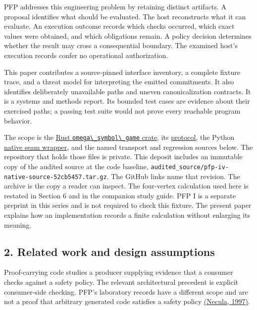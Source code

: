 \documentclass[
  11pt,
]{article}
\newcommand{\passthrough}[1]{#1}
\begin{document}
PFP addresses this engineering problem by retaining distinct artifacts.
A proposal identifies what should be evaluated. The host reconstructs
what it can evaluate. An execution outcome records which checks
occurred, which exact values were obtained, and which obligations
remain. A policy decision determines whether the result may cross a
consequential boundary. The examined host's execution records confer no
operational authorization.

This paper contributes a source-pinned interface inventory, a complete
fixture trace, and a threat model for interpreting the emitted
commitments. It also identifies deliberately unavailable paths and
uneven canonicalization contracts. It is a systems and methods report.
Its bounded test cases are evidence about their exercised paths; a
passing test suite would not prove every reachable program behavior.

The scope is the
\href{https://github.com/dbccpage/the_symbol_game/tree/52cb5457f6c485ba548cfd292f6012a941ed22cf/engine/crates_rs/core_symbol_game}{Rust
\passthrough{\lstinline!omega\_symbol\_game!} crate}, its
\href{https://github.com/dbccpage/the_symbol_game/blob/52cb5457f6c485ba548cfd292f6012a941ed22cf/engine/crates_rs/core_symbol_game/src/protocol.rs}{protocol},
the Python
\href{https://github.com/dbccpage/the_symbol_game/blob/52cb5457f6c485ba548cfd292f6012a941ed22cf/symbol_game/ffi.py}{native
seam wrapper}, and the named transport and regression sources below. The
repository that holds those files is private. This deposit includes an
immutable copy of the audited source at the code baseline,
\nolinkurl{audited_source/pfp-iv-native-source-52cb5457.tar.gz}. The GitHub
links name that revision. The archive is the copy a reader can inspect.
The four-vertex calculation used here is restated in Section 6 and in
the companion study guide. PFP I is a separate preprint in this series
and is not required to check this fixture. The present paper explains
how an implementation records a finite calculation without enlarging its
meaning.

\subsection{2. Related work and design
assumptions}\label{related-work-and-design-assumptions}

Proof-carrying code studies a producer supplying evidence that a
consumer checks against a safety policy. The relevant architectural
precedent is explicit consumer-side checking. PFP's laboratory records
have a different scope and are not a proof that arbitrary generated code
satisfies a safety policy
\href{https://doi.org/10.1145/263699.263712}{(Necula, 1997)}.
\end{document}
